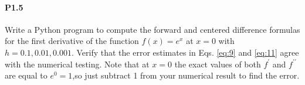 \paragraph*{P1.5}
Write a Python program to compute the forward and centered difference formulas for the first derivative of the function $f(x) = e^x $ at $x = 0$ with $h = 0.1, 0.01, 0.001$. Verify that the error estimates in Eqs. \eqref{eq:9} and \eqref{eq:11} agree with the numerical testing. Note that at $x =0$ the exact values of both $f^\prime$ and $f^{\prime\prime}$ are equal to $e^0 = 1$,so just subtract 1 from your numerical result to find the error.


